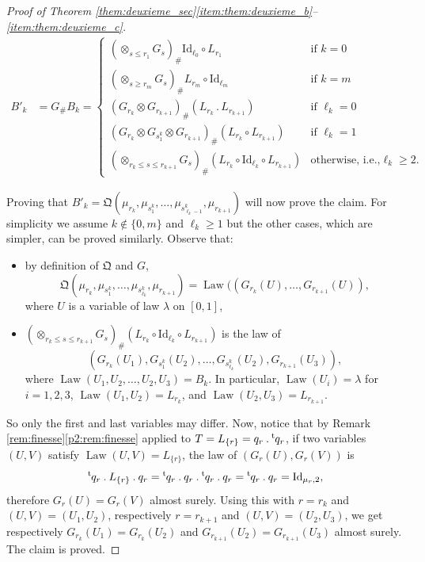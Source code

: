 \documentclass[11pt]{article}
\newcommand{\ie}{i.e.,\xspace}
\newcommand{\ldot}{\mathbin{.}}
\theoremstyle{plain}
\theoremstyle{definition}
\newcommand{\id}{\mathrm{Id}}
\newcommand{\como}{\mathfrak{Q}}
\newcommand{\trans}{{}^{\mathrm{t}}\mkern-1mu}
\newcommand{\la}{\lambda}
\newcommand{\law}{\operatorname{Law}}
\begin{document}
\begin{proof}[Proof of Theorem \ref{them:deuxieme_sec}\eqref{item:them:deuxieme_b}--\eqref{item:them:deuxieme_c}]
\begin{align*}
B'_k&=G_\# B_k=\begin{cases}
(\otimes_{s\leqslant r_1} G_{s})_\#\id_{\ell_0}\circ L_{r_1}&\text{if }k=0\\
(\otimes_{s\geqslant r_m} G_{s})_\#L_{r_m}\circ \id_{\ell_m}&\text{if }k=m\\
(G_{r_k}\otimes G_{r_{k+1}})_\#(L_{r_{k}}{}\ldot L_{r_{k+1}})&\text{if }\ell_k=0\\
(G_{r_k}\otimes G_{s_1^k}\otimes G_{r_{k+1}})_\#(L_{r_{k}}\circ L_{r_{k+1}})&\text{if }\ell_k=1\\
(\otimes_{r_k\leqslant s\leqslant r_{k+1}}G_s)_\#(L_{r_{k}}\circ\id_{\ell_k}\circ L_{r_{k+1}})&\text{otherwise, \ie }\ell_k\geq 2.
\end{cases}
\end{align*}

\noindent Proving that $B'_k=\como(\mu_{r_k},\mu_{s^k_1},\ldots,\mu_{s^k_{\ell_k-1}},\mu_{r_{k+1}})$ will now prove the claim. For simplicity we assume $k\notin \{0,m\}$ and $\ell_k\geq 1$ but the other cases, which are simpler, can be proved similarly. Observe that:
\begin{itemize}
\item
by definition of $\como$ and $G$,
\[
\como(\mu_{r_k},\mu_{s_1^k},\ldots,\mu_{s^k_{\ell_k}},\mu_{r_{k+1}})=\law((G_{r_k}(U),\ldots,G_{r_{k+1}}(U)),
\]
where $U$ is a variable of law $\la$ on $[0,1]$,

\item
$(\otimes_{r_k\leqslant s\leqslant r_{k+1}}G_s)_\#(L_{r_{k}}\circ\id_{\ell_k}\circ L_{r_{k+1}})$ is the law of
\[
(G_{r_k}(U_1),G_{s^k_1}(U_2),\ldots,G_{s^k_{\ell_k}}(U_2),G_{r_{k+1}}(U_3)),
\]
where $\law(U_1,U_2,\ldots,U_2,U_3)=B_k$. In particular, $\law(U_i)=\la$ for $i=1,2,3$, $\law(U_1,U_2)=L_{r_k}$, and $\law(U_2,U_3)=L_{r_{k+1}}$.
\end{itemize}
So only the first and last variables may differ. Now, notice that by Remark \ref{rem:finesse}\eqref{p2:rem:finesse} applied to $T=L_{\{r\}}=q_r\ldot\trans q_r$, if two variables $(U,V)$ satisfy $\law(U,V)=L_{\{r\}}$, the law of $(G_{r}(U),G_r(V))$ is
\[
\trans q_r\ldot L_{\{r\}}{}\ldot q_r=\trans q_r\ldot q_r\ldot\trans q_r\ldot q_r=\trans q_r\ldot q_r=\id_{\mu_r,2},
\]
therefore $G_{r}(U)=G_r(V)$ almost surely. Using this with $r={r_k}$ and $(U,V)=(U_1,U_2)$, respectively $r=r_{k+1}$ and $(U,V)=(U_2,U_3)$, we get respectively $G_{r_k}(U_1)=G_{r_k}(U_2)$ and $G_{r_{k+1}}(U_2)=G_{r_{k+1}}(U_3)$ almost surely. The claim is proved.


\end{proof}
\end{document}
